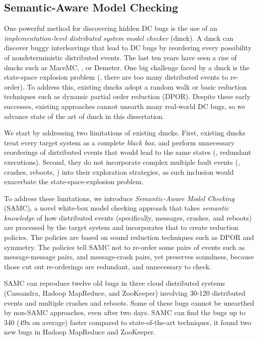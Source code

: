 \subsection{Semantic-Aware Model Checking}

One powerful method for discovering hidden DC bugs is the use of an
\textit{implementation-level distributed system model checker} (dmck).  A dmck
can discover buggy interleavings that lead to DC bugs by reordering every
possibility of nondeterministic distributed events. The last ten years have seen
a rise of dmcks such as MaceMC, \modist, or Demeter. One big challenge faced by
a dmck is the state-space explosion problem (\ie, there are too many distributed
events to re-order). To address this, existing dmcks adopt a random walk or
basic reduction techniques such as dynamic partial order reduction (DPOR).
Despite these early successes, existing approaches cannot unearth many
real-world DC bugs, so we advance state of the art of dmck in this dissertation.

We start by addressing two limitations of existing dmcks. First, existing dmcks
treat every target system as a complete \textit{black box}, and perform
unnecessary reorderings of distributed events that would lead to the same states
(\ie, redundant executions). Second, they do not incorporate complex multiple
fault events (\eg, crashes, reboots, \etc) into their exploration strategies, as
such inclusion would exacerbate the state-space-explosion problem.

To address these limitations, we introduce \textit{Semantic-Aware Model
Checking} (SAMC), a novel white-box model checking approach that takes
\textit{semantic knowledge} of how distributed events (specifically, messages,
crashes, and reboots) are processed by the target system and incorporates that
to create reduction policies. The policies are based on sound reduction
techniques such as DPOR and symmetry. The policies tell SAMC not to re-order
some pairs of events such as message-message pairs, and message-crash pairs, yet
preserves soundness, because those cut out re-orderings are redundant, and
unnecessary to check.

SAMC can reproduce twelve old bugs in three cloud distributed systems
(Cassandra, Hadoop MapReduce, and ZooKeeper) involving 30-120 distributed events
and multiple crashes and reboots. Some of these bugs cannot be unearthed by
non-SAMC approaches, even after two days. SAMC can find the bugs up to 340 (49x
on average) faster compared to state-of-the-art techniques, it found two new
bugs in Hadoop MapReduce and ZooKeeper.


